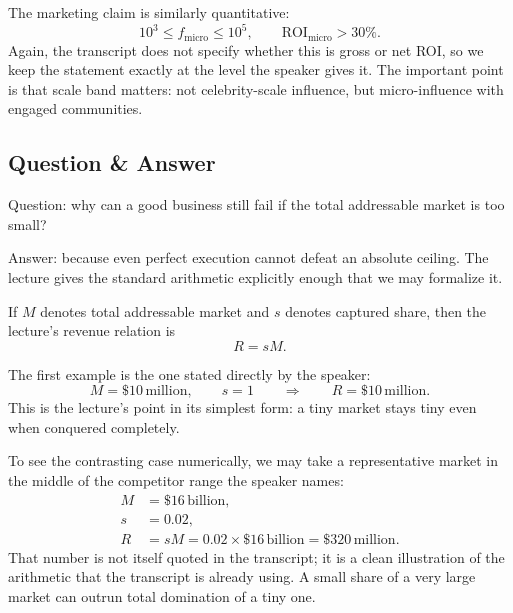 The marketing claim is similarly quantitative:
\begin{equation}
10^3 \le f_{\text{micro}} \le 10^5, \qquad
\mathrm{ROI}_{\text{micro}} > 30\%.
\end{equation}
Again, the transcript does not specify whether this is gross or net ROI, so we keep the statement exactly at the level the speaker gives it. The important point is that scale band matters: not celebrity-scale influence, but micro-influence with engaged communities.

\subsection{Question \& Answer}

Question: why can a good business still fail if the total addressable market is too small?

Answer: because even perfect execution cannot defeat an absolute ceiling. The lecture gives the standard arithmetic explicitly enough that we may formalize it.

\begin{definition}
If \(M\) denotes total addressable market and \(s\) denotes captured share, then the lecture's revenue relation is
\begin{equation}
R = sM.
\end{equation}
\end{definition}

The first example is the one stated directly by the speaker:
\begin{equation}
M=\$10\,\text{million}, \qquad s=1 \qquad \Rightarrow \qquad R=\$10\,\text{million}.
\end{equation}
This is the lecture's point in its simplest form: a tiny market stays tiny even when conquered completely.

To see the contrasting case numerically, we may take a representative market in the middle of the competitor range the speaker names:
\begin{align}
M &= \$16\,\text{billion}, \\
s &= 0.02, \\
R &= sM = 0.02 \times \$16\,\text{billion} = \$320\,\text{million}.
\end{align}
That number is not itself quoted in the transcript; it is a clean illustration of the arithmetic that the transcript is already using. A small share of a very large market can outrun total domination of a tiny one.

\begin{figure}[h]
\centering
{}
\end{figure}

